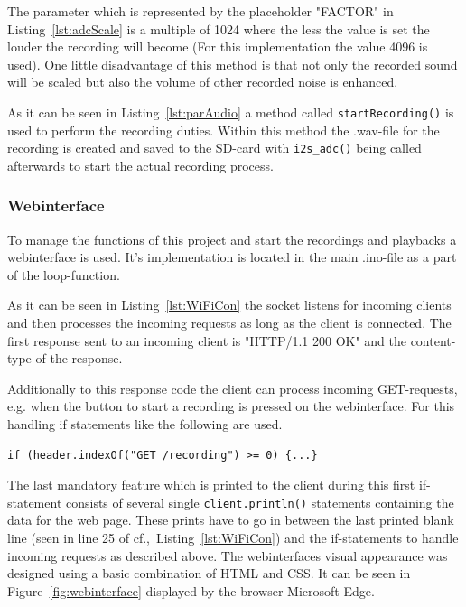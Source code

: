 The parameter which is represented by the placeholder "FACTOR" in Listing~\ref{lst:adcScale} is a multiple of 1024 where the less the value is set the louder the recording will become (For this implementation the value 4096 is used).
One little disadvantage of this method is that not only the recorded sound will be scaled but also the volume of other recorded noise is enhanced.

As it can be seen in Listing~\ref{lst:parAudio} a method called \texttt{startRecording()} is used to perform the recording duties.
Within this method the .wav-file for the recording is created and saved to the SD-card with \texttt{i2s\_adc()} being called afterwards to start the actual recording process.

\subsubsection{Webinterface}
To manage the functions of this project and start the recordings and playbacks a webinterface is used.
It's implementation is located in the main .ino-file as a part of the loop-function.

As it can be seen in Listing~\ref{lst:WiFiCon} the socket listens for incoming clients and then processes the incoming requests as long as the client is connected.
The first response sent to an incoming client is "HTTP/1.1 200 OK" and the content-type of the response.

Additionally to this response code the client can process incoming GET-requests, e.g. when the button to start a recording is pressed on the webinterface.
For this handling if statements like the following are used.
\begin{lstlisting}[style=inText] 
	if (header.indexOf("GET /recording") >= 0) {...}  
\end{lstlisting}
The last mandatory feature which is printed to the client during this first if-statement consists of several single \texttt{client.println()} statements containing the data for the web page.
These prints have to go in between the last printed blank line (seen in line 25 of cf.,~Listing~\ref{lst:WiFiCon}) and the if-statements to handle incoming requests as described above.
The webinterfaces visual appearance was designed using a basic combination of HTML and CSS.
It can be seen in Figure~\ref{fig:webinterface} displayed by the browser Microsoft Edge.

